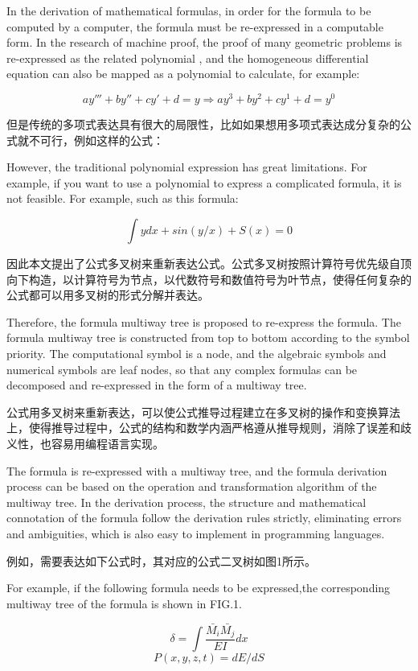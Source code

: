 \documentclass[runningheads]{llncs}
\begin{document}
In the derivation of mathematical formulas, in order for the formula to be computed by a computer, the formula must be re-expressed in a computable form. In the research of machine proof, the proof of many geometric problems is re-expressed as the related polynomial \cite{ref_proc1}, and the homogeneous differential equation can also be mapped as a polynomial to calculate, for example:

$$ay'''+by''+cy'+d=y \Rightarrow ay^3+by^2+cy^1+d=y^0$$

但是传统的多项式表达具有很大的局限性，比如如果想用多项式表达成分复杂的公式就不可行，例如这样的公式：

However, the traditional polynomial expression has great limitations. For example, if you want to use a polynomial to express a complicated formula, it is not feasible. For example, such as this formula:

$$\int{ydx}+sin(y/x)+S(x)=0$$

因此本文提出了公式多叉树来重新表达公式。公式多叉树按照计算符号优先级自顶向下构造，以计算符号为节点，以代数符号和数值符号为叶节点，使得任何复杂的公式都可以用多叉树的形式分解并表达。

Therefore, the formula multiway tree is proposed to re-express the formula. The formula multiway tree is constructed from top to bottom according to the symbol priority. The computational symbol is a node, and the algebraic symbols and numerical symbols are leaf nodes, so that any complex formulas can be decomposed and re-expressed in the form of a multiway tree.

公式用多叉树来重新表达，可以使公式推导过程建立在多叉树的操作和变换算法上，使得推导过程中，公式的结构和数学内涵严格遵从推导规则，消除了误差和歧义性，也容易用编程语言实现。

The formula is re-expressed with a multiway tree, and the formula derivation process can be based on the operation and transformation algorithm of the multiway tree. In the derivation process, the structure and mathematical connotation of the formula follow the derivation rules strictly, eliminating errors and ambiguities, which is also easy to implement in programming languages.

例如，需要表达如下公式时，其对应的公式二叉树如图1所示。

For example, if the following formula needs to be expressed,the corresponding multiway tree of the formula is shown in FIG.1.

$$\delta = \int \frac{\bar{M_i}\bar{M_j}}{EI}dx $$
$$P(x,y,z,t)=dE/dS$$
\end{document}
